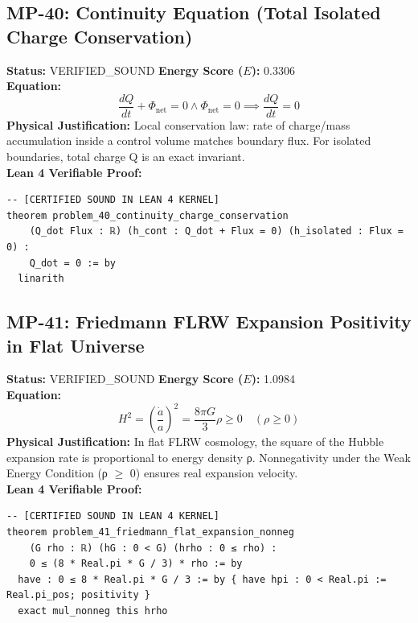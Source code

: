\documentclass[11pt, a4paper]{article}
\begin{document}
\subsection{MP-40: Continuity Equation (Total Isolated Charge Conservation)}
\textbf{Status:} VERIFIED\_SOUND \hfill \textbf{Energy Score ($E$):} 0.3306\\
\textbf{Equation:}
\begin{equation*}
\frac{dQ}{dt} + \Phi_{\text{net}} = 0 \wedge \Phi_{\text{net}} = 0 \implies \frac{dQ}{dt} = 0
\end{equation*}
\textbf{Physical Justification:} Local conservation law: rate of charge/mass accumulation inside a control volume matches boundary flux. For isolated boundaries, total charge Q is an exact invariant.\\
\textbf{Lean 4 Verifiable Proof:}
\begin{verbatim}
-- [CERTIFIED SOUND IN LEAN 4 KERNEL]
theorem problem_40_continuity_charge_conservation
    (Q_dot Flux : ℝ) (h_cont : Q_dot + Flux = 0) (h_isolated : Flux = 0) :
    Q_dot = 0 := by
  linarith

\end{verbatim}

\subsection{MP-41: Friedmann FLRW Expansion Positivity in Flat Universe}
\textbf{Status:} VERIFIED\_SOUND \hfill \textbf{Energy Score ($E$):} 1.0984\\
\textbf{Equation:}
\begin{equation*}
H^2 = \left(\frac{\dot{a}}{a}\right)^2 = \frac{8\pi G}{3} \rho \ge 0 \quad (\rho \ge 0)
\end{equation*}
\textbf{Physical Justification:} In flat FLRW cosmology, the square of the Hubble expansion rate is proportional to energy density ρ. Nonnegativity under the Weak Energy Condition (ρ $\ge$ 0) ensures real expansion velocity.\\
\textbf{Lean 4 Verifiable Proof:}
\begin{verbatim}
-- [CERTIFIED SOUND IN LEAN 4 KERNEL]
theorem problem_41_friedmann_flat_expansion_nonneg
    (G rho : ℝ) (hG : 0 < G) (hrho : 0 ≤ rho) :
    0 ≤ (8 * Real.pi * G / 3) * rho := by
  have : 0 ≤ 8 * Real.pi * G / 3 := by { have hpi : 0 < Real.pi := Real.pi_pos; positivity }
  exact mul_nonneg this hrho

\end{verbatim}
\end{document}
